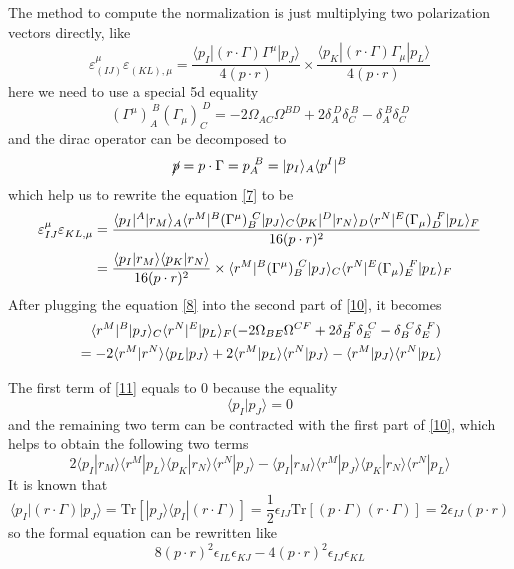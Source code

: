 \documentclass[12pt]{article}
\newcommand{\aket}[1]{|#1\rangle}
\newcommand{\abra}[1]{\langle #1|}
\newcommand{\inner}[2]{\langle #1 | #2 \rangle}
\begin{document}
The method to compute the normalization is just multiplying two polarization vectors directly, like
\begin{equation}
    \varepsilon^\mu_{(IJ)}\varepsilon^{}_{(KL),\mu}=\frac{\abra{p_I}(r\cdot \Gamma)\Gamma^\mu\aket{p_J}}{4(p\cdot r)}\times \frac{\abra{p_K}(r\cdot \Gamma)\Gamma_\mu\aket{p_L}}{4(p\cdot r)}
    \label{7}
\end{equation}
here we need to use a special 5d equality
\begin{equation}
    (\Gamma^\mu)_A^{\ B}(\Gamma_\mu)_C^{\ D}=-2\Omega_{AC}\Omega^{BD}+2\delta_A^{\ D}\delta_C^{\ B}-\delta_A^{\ B}\delta_C^{\ D}
    \label{8}
\end{equation}
and the dirac operator can be decomposed to
\begin{equation}
    \cancel{p}=p\cdot \Gamma=p_A^{\ B}= \aket{p_I}_A\abra{p^I}^B
\end{equation}
which help us to rewrite the equation \eqref{7} to be
\begin{align}
    \varepsilon^\mu_{IJ}\varepsilon^{}_{KL,\mu}&=\frac{\abra{p_I}^A\aket{r_M}_A\abra{r^M}^B(\Gamma^\mu)_B^{\ C}\aket{p_J}_C \abra{p_K}^D\aket{r_N}_D\abra{r^N}^E(\Gamma_\mu)_D^{\ F}\aket{p_L}_F}{16(p\cdot r)^2}\notag \\
    &=\frac{\inner{p_I}{r_M}\inner{p_K}{r_N}}{16(p\cdot r)^2}\times \abra{r^M}^B(\Gamma^\mu)_B^{\ C}\aket{p_J}_C \abra{r^N}^E(\Gamma_\mu)_E^{\ F}\aket{p_L}_F
    \label{10}
\end{align}
After plugging the equation \eqref{8} into the second part of \eqref{10}, it becomes
\begin{align}
    &\quad \abra{r^M}^B \aket{p_J}_C \abra{r^N}^E \aket{p_L}_F (-2\Omega_{BE}\Omega^{CF}+2\delta_B^{\ F}\delta_E^{\ C}-\delta_B^{\ C}\delta_E^{\ F})\notag \\
    &=-2\inner{r^M}{r^N}\inner{p_L}{p_J}+2\inner{r^M}{p_L}\inner{r^N}{p_J}-\inner{r^M}{p_J}\inner{r^N}{p_L}
    \label{11}
\end{align}

The first term of \eqref{11} equals to 0 because the equality
\begin{equation}
    \inner{p_I}{p_J}=0
\end{equation}
and the remaining two term can be contracted with the first part of \eqref{10}, which helps to obtain the following two terms
\begin{equation}
    2\inner{p_I}{r_M}\inner{r^M}{p_L}\inner{p_K}{r_N}\inner{r^N}{p_J}-\inner{p_I}{r_M}\inner{r^M}{p_J}\inner{p_K}{r_N}\inner{r^N}{p_L}
\end{equation}
It is known that 
\begin{equation}
    \abra{p_I}(r\cdot \Gamma) \aket{p_J}=\mathrm{Tr}[\aket{p_J}\abra{p_I}(r\cdot \Gamma)]=\frac{1}{2}\epsilon_{IJ}\mathrm{Tr}[(p\cdot \Gamma)(r\cdot \Gamma)]=2\epsilon_{IJ}(p\cdot r)
\end{equation}
so the formal equation can be rewritten like 
\begin{equation}
    8(p\cdot r)^2\epsilon_{IL}\epsilon_{KJ}-4(p\cdot r)^2\epsilon_{IJ}\epsilon_{KL}
\end{equation}
\end{document}
